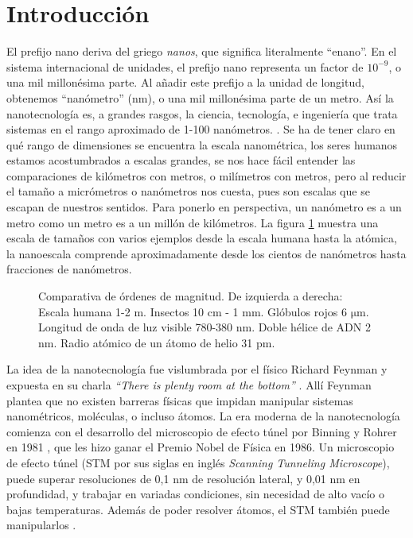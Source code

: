 \chapter*{Introducción}

El prefijo nano deriva del griego \emph{nanos}, que significa literalmente ``enano''. En el sistema internacional de unidades, el prefijo nano representa un factor de $\mathrm{10^{-9}}$, o una mil millonésima parte. Al añadir este prefijo a la unidad de longitud, obtenemos ``nanómetro'' (nm), o una mil millonésima parte de un metro. Así la nanotecnología es, a grandes rasgos, la ciencia, tecnología, e ingeniería que trata sistemas en el rango aproximado de 1-100 nanómetros. \citep{Haick2013,Gressler2013}. Se ha de tener claro en qué rango de dimensiones se encuentra la escala nanométrica, los seres humanos estamos acostumbrados a escalas grandes, se nos hace fácil entender las comparaciones de kilómetros con metros, o milímetros con metros, pero al reducir el tamaño a micrómetros o nanómetros nos cuesta, pues son escalas que se escapan de nuestros sentidos. Para ponerlo en perspectiva, un nanómetro es a un metro como un metro es a un millón de kilómetros. La figura \ref{fig:scale} muestra una escala de tamaños con varios ejemplos desde la escala humana hasta la atómica, la nanoescala comprende aproximadamente desde los cientos de nanómetros hasta fracciones de nanómetros.

\begin{figure}[h!]
	\centering
	\caption[Comparativa de ódenes de magnitud desde metros hasta picometros]{Comparativa de órdenes de magnitud. De izquierda a derecha: Escala humana 1-2 m. Insectos 10 cm - 1 mm. Glóbulos rojos 6 $\mathrm{\mu}$m. Longitud de onda de luz visible 780-380 nm. Doble hélice de ADN 2 nm. Radio atómico de un átomo de helio 31 pm.}
\label{fig:scale}
\end{figure}

La idea de la nanotecnología fue vislumbrada por el físico Richard Feynman y expuesta en su charla \emph{``There is plenty room at the bottom''} \citep{Feynman1960}. Allí Feynman plantea que no existen barreras físicas que impidan manipular sistemas nanométricos, moléculas, o incluso átomos. La era moderna de la nanotecnología comienza con el desarrollo del microscopio de efecto túnel por Binning y Rohrer en 1981 \citep{Binnig1982}, que les hizo ganar el Premio Nobel de Física en 1986. Un microscopio de efecto túnel (STM por sus siglas en inglés \emph{Scanning Tunneling Microscope}), puede superar resoluciones de 0,1 nm de resolución lateral, y 0,01 nm en profundidad, y trabajar en variadas condiciones, sin necesidad de alto vacío o bajas temperaturas. Además de poder resolver átomos, el STM también puede manipularlos \citep{Chen2008}.

